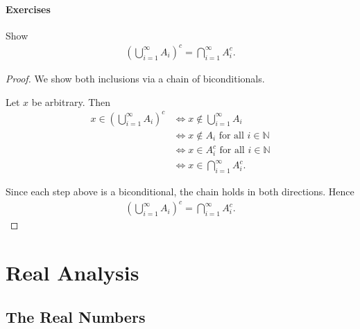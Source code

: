 \documentclass[12pt]{book}
\begin{document}
\subsubsection*{Exercises}

\begin{exercise}
    Show 
    \begin{align*}
        \left(\bigcup_{i=1}^{\infty} A_i\right)^c = \bigcap_{i=1}^{\infty} A_i^c.
    \end{align*}
\end{exercise}

\begin{proof}
    We show both inclusions via a chain of biconditionals.

    Let $x$ be arbitrary. Then
    \begin{align*}
        x \in \left(\bigcup_{i=1}^{\infty} A_i\right)^c
        &\iff x \notin \bigcup_{i=1}^{\infty} A_i \\
        &\iff x \notin A_i \text{ for all } i \in \mathbb{N} \\
        &\iff x \in A_i^c \text{ for all } i \in \mathbb{N} \\
        &\iff x \in \bigcap_{i=1}^{\infty} A_i^c.
    \end{align*}

    Since each step above is a biconditional, the chain holds in both directions. Hence
    \begin{align*}
        \left(\bigcup_{i=1}^{\infty} A_i\right)^c = \bigcap_{i=1}^{\infty} A_i^c.
    \end{align*}
\end{proof}


\chapter{Real Analysis}

\section{The Real Numbers}




\end{document}
